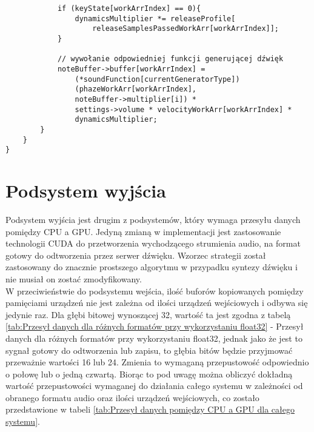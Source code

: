 \begin{lstlisting}
            if (keyState[workArrIndex] == 0){
                dynamicsMultiplier *= releaseProfile[
                    releaseSamplesPassedWorkArr[workArrIndex]];
            }

            // wywołanie odpowiedniej funkcji generującej dźwięk
            noteBuffer->buffer[workArrIndex] = 
                (*soundFunction[currentGeneratorType])
                (phazeWorkArr[workArrIndex],
                noteBuffer->multiplier[i]) *
                settings->volume * velocityWorkArr[workArrIndex] *
                dynamicsMultiplier;
        }
    }
}
\end{lstlisting}


\section{Podsystem wyjścia}

Podsystem wyjścia jest drugim z podsystemów, który wymaga przesyłu danych pomiędzy CPU a GPU. Jedyną zmianą w implementacji jest zastosowanie technologii CUDA\cite{bib:CUDA} do przetworzenia wychodzącego strumienia audio, na format gotowy do odtworzenia przez serwer dźwięku. Wzorzec strategii został zastosowany do znacznie prostszego algorytmu w przypadku syntezy dźwięku i nie musiał on zostać zmodyfikowany. 
\\
W przeciwieństwie do podsystemu wejścia, ilość buforów kopiowanych pomiędzy pamięciami urządzeń nie jest zależna od ilości urządzeń wejściowych i odbywa się jedynie raz. Dla głębi bitowej wynoszącej 32, wartość ta jest zgodna z tabelą \ref{tab:Przesył danych dla różnych formatów przy wykorzystaniu float32} - Przesył danych dla różnych formatów przy wykorzystaniu float32, jednak jako że jest to sygnał gotowy do odtworzenia lub zapisu, to głębia bitów będzie przyjmować przeważnie wartości 16 lub 24. Zmienia to wymaganą przepustowość odpowiednio o połowę lub o jedną czwartą. Biorąc to pod uwagę można obliczyć dokładną wartość przepustowości wymaganej do działania całego systemu w zależności od obranego formatu audio oraz ilości urządzeń wejściowych, co zostało przedstawione w tabeli \ref{tab:Przesył danych pomiędzy CPU a GPU dla całego systemu}.

